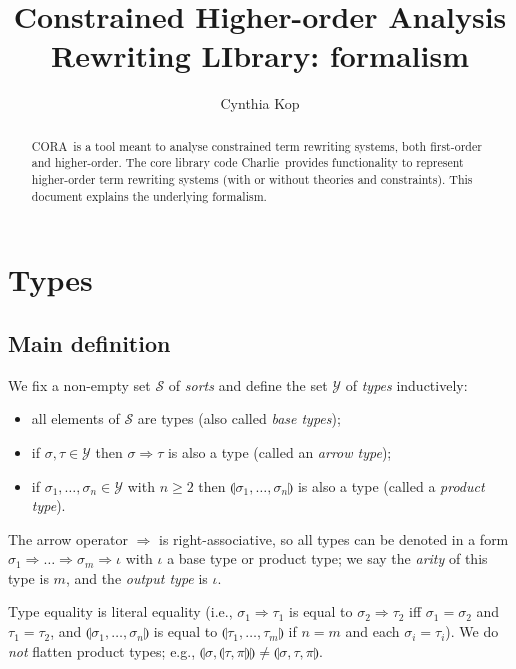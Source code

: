 \documentclass{lmcs}
\theoremstyle{theorem}\newtheorem{theorem}{Theorem}
\theoremstyle{theorem}\newtheorem{lemma}[theorem]{Lemma}
\theoremstyle{theorem}\newtheorem{corollary}[theorem]{Corollary}
\theoremstyle{definition}\newtheorem{definition}[theorem]{Definition}
\theoremstyle{definition}\newtheorem{example}[theorem]{Example}
\newcommand{\Sorts}{\mathcal{S}}
\newcommand{\Types}{\mathcal{Y}}
\newcommand{\asort}{\iota}
\newcommand{\atype}{\sigma}
\newcommand{\btype}{\tau}
\newcommand{\ctype}{\pi}
\newcommand{\product}[2]{\llparenthesis #1,\dots,#2 \rrparenthesis}
\newcommand{\pair}[2]{\llparenthesis #1,#2 \rrparenthesis}
\newcommand{\triple}[3]{\llparenthesis #1,#2,#3 \rrparenthesis}
\newcommand{\arrtype}{\Rightarrow}
\newcommand{\cora}{\textsf{CORA}\xspace}
\newcommand{\charlie}{\textsf{Charlie}\xspace}
\begin{document}
\title{Constrained Higher-order Analysis Rewriting LIbrary: formalism}
\author{Cynthia Kop}
\address{Department of Software Science, Radboud University Nijmegen}

\maketitle

\begin{abstract}
\cora\ is a tool meant to analyse constrained term rewriting systems, both
first-order and higher-order.
The core library code \charlie\ provides functionality to represent
higher-order term rewriting systems (with or without theories and constraints).
This document explains the underlying formalism.
\end{abstract}

\section{Types}\label{sec:types}

\subsection{Main definition}

We fix a non-empty set $\Sorts$ of \emph{sorts} and define the set $\Types$ of
\emph{types} inductively:
\begin{itemize}
\item all elements of $\Sorts$ are types (also called \emph{base types});
\item if $\atype,\btype \in \Types$ then $\atype \arrtype \btype$ is also a type
  (called an \emph{arrow type});
\item if $\atype_1,\dots,\atype_n \in \Types$ with $n \geq 2$ then
  $\product{\atype_1}{\atype_n}$ is also a type (called a \emph{product type}).
\end{itemize}
The arrow operator $\arrtype$ is right-associative, so all types can be denoted
in a form $\atype_1 \arrtype \dots \arrtype \atype_m \arrtype \asort$ with
$\asort$ a base type or product type; we say the \emph{arity} of this type is
$m$, and the \emph{output type} is $\asort$.

\medskip
Type equality is literal equality (i.e., $\atype_1 \arrtype \btype_1$ is equal
to $\atype_2 \arrtype \btype_2$ iff $\atype_1 = \atype_2$ and $\btype_1 =
\btype_2$, and $\product{\atype_1}{\atype_n}$ is equal to
$\product{\btype_1}{\btype_m}$ if $n = m$ and each $\atype_i = \btype_i$).
We do \emph{not} flatten product types; e.g.,
$\pair{\atype}{\pair{\btype}{\ctype}} \neq \triple{\atype}{\btype}{\ctype}$.
\end{document}
